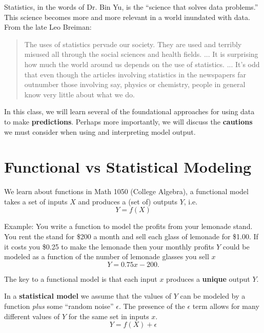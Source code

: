 \documentclass[12pt]{notes}
\begin{document}
Statistics, in the words of Dr. Bin Yu, is the ``science that solves data problems.'' This science becomes more and more relevant in a world inundated with data. From the late Leo Breiman:

\begin{quotation}
The uses of statistics pervade our society. They are used and terribly misused all through the social sciences and health fields. ... It is surprising how much the world around us depends on the use of statistics. ... It’s odd that even though the articles involving statistics in the newspapers far outnumber those involving say, physics or chemistry, people in general know very little about what we do.
\end{quotation}

In this class, we will learn several of the foundational approaches for using data to make \textbf{predictions}. Perhaps more importantly, we will discuss the \textbf{cautions} we must consider when using and interpreting model output. 


\begin{minipage}[l][3cm][c]{\textwidth}

\end{minipage}


\section{Functional vs Statistical Modeling}

We learn about functions in Math 1050 (College Algebra), a functional model takes a set of inputs $X$ and produces a (set of) outputs $Y$, i.e.
\[Y = f(X)\]

Example: 
You write a function to model the profits from your lemonade stand. You rent the stand for \$200 a month and sell each glass of lemonade for \$1.00. If it costs you \$0.25 to make the lemonade then your monthly profits $Y$ could be modeled as a function of the number of lemonade glasses you sell $x$
\[Y = 0.75x - 200.\] 

The key to a functional model is that each input $x$ produces a \textbf{unique} output $Y$.

\vspace{0.5cm}
In a \textbf{statistical model} we assume that the values of $Y$ can be modeled by a function \textit{plus} some ``random noise'' $\epsilon$. The presence of the $\epsilon$ term allows for many different values of $Y$ for the same set in inputs $x$. 
\[Y = f(X) + \epsilon\]
\end{document}
